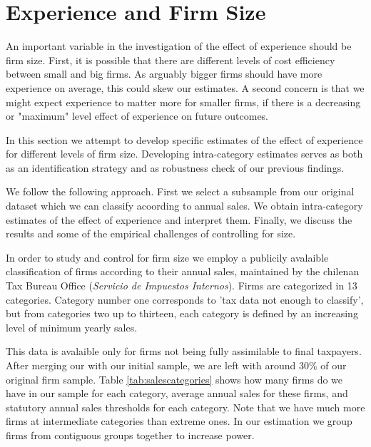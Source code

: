 \section{Experience and Firm Size}
An important variable in the investigation of the effect of experience should be firm size. First, it is possible that there are different levels of cost efficiency between small and big firms. As arguably bigger firms should have more experience on average, this could skew our estimates. A second concern is that we might expect experience to matter more for smaller firms, if there is a decreasing or "maximum" level effect of experience on future outcomes.

In this section we attempt to develop specific estimates of the effect of experience for different levels of firm size. Developing intra-category estimates serves as both as an identification strategy and as  robustness check of our previous findings.

 We follow the following approach. First we select a subsample from our original dataset which we can classify acoording to annual sales.  We obtain intra-category estimates of the effect of experience and interpret them. Finally, we discuss the results and some of the empirical challenges of controlling for size.

In order to study and control for firm size we employ a publicily avalaible classification of firms according to their annual sales, maintained by the chilenan Tax Bureau Office (\textit{Servicio de Impuestos Internos}). Firms are categorized in 13 categories. Category number one  corresponds to 'tax data not enough to classify', but from categories two up to thirteen, each category is defined by an increasing level of minimum yearly sales.

This data is avalaible only for firms not being fully assimilable to final taxpayers. After merging our with our initial sample, we are left with around 30\% of our original firm sample. Table \ref{tab:salescategories} shows how many firms do we have in our sample for each category, average annual sales for these firms, and statutory annual sales thresholds for each category. Note that we have much more firms at intermediate categories than extreme ones. In our estimation we group firms from contiguous groups together to increase power.

